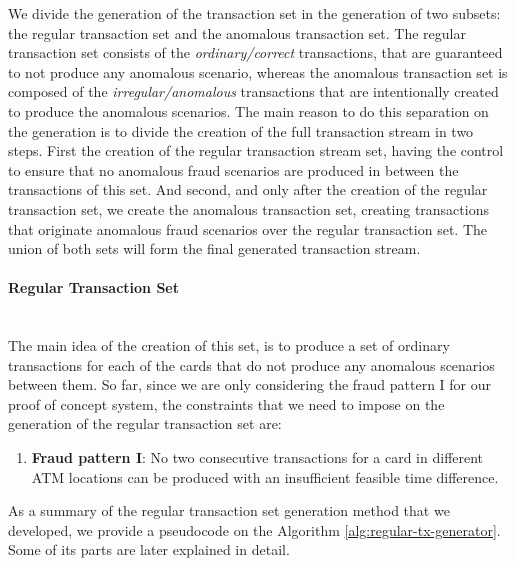 We divide the generation of the transaction set in the generation of two subsets: the regular transaction set and the anomalous transaction set. The regular transaction set consists of the \emph{ordinary/correct} transactions, that are guaranteed to not produce any anomalous scenario, whereas the anomalous transaction set is composed of the \emph{irregular/anomalous} transactions that are intentionally created to produce the anomalous scenarios. The main reason to do this separation on the generation is to divide the creation of the full transaction stream in two steps. First the creation of the regular transaction stream set, having the control to ensure that no anomalous fraud scenarios are produced in between the transactions of this set. And second, and only after the creation of the regular transaction set, we create the anomalous transaction set, creating transactions that originate anomalous fraud scenarios over the regular transaction set. The union of both sets will form the final generated transaction stream.

\paragraph{Regular Transaction Set\\\\}

The main idea of the creation of this set, is to produce a set of ordinary transactions for each of the cards that do not produce any anomalous scenarios between them. So far, since we are only considering the fraud pattern I for our proof of concept system, the constraints that we need to impose on the generation of the regular transaction set are:

\begin{enumerate}
    \renewcommand{\labelenumi}{\Roman{enumi}.}  
    \item \textbf{Fraud pattern I}: No two consecutive transactions for a card in different ATM locations can be produced with an insufficient feasible time difference.
\end{enumerate}

As a summary of the regular transaction set generation method that we developed, we provide a pseudocode on the Algorithm \ref{alg:regular-tx-generator}. Some of its parts are later explained in detail.\\

